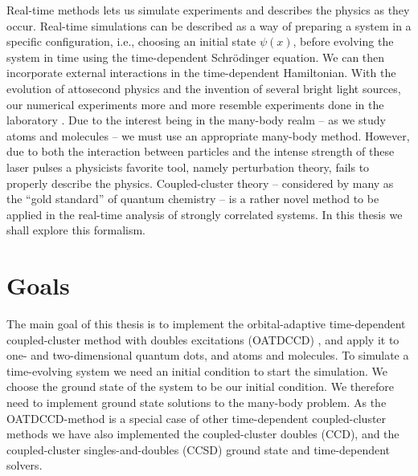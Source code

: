     Real-time methods lets us simulate experiments and describes the physics as
    they occur.
    Real-time simulations can be described as a way of preparing a system in a
    specific configuration, i.e., choosing an initial state $\psi(x)$, before
    evolving the system in time using the time-dependent Schrödinger equation.
    We can then incorporate external interactions in the time-dependent
    Hamiltonian.
    With the evolution of attosecond physics and the invention of several bright
    light sources, our numerical experiments more and more resemble experiments
    done in the laboratory \cite{joachain2012atoms}.
    Due to the interest being in the many-body realm -- as we study atoms and
    molecules -- we must use an appropriate many-body method.
    However, due to both the interaction between particles and the intense
    strength of these laser pulses a physicists favorite tool, namely
    perturbation theory, fails to properly describe the physics.
    Coupled-cluster theory -- considered by many as the ``gold standard'' of
    quantum chemistry -- is a rather novel method to be applied in the real-time
    analysis of strongly correlated systems.
    In this thesis we shall explore this formalism.


    \section{Goals}
        The main goal of this thesis is to implement the orbital-adaptive
        time-dependent coupled-cluster method with doubles excitations (OATDCCD)
        \cite{kvaal2012ab}, and apply it to one- and two-dimensional quantum
        dots, and atoms and molecules.
        To simulate a time-evolving system we need an initial condition to start
        the simulation.
        We choose the ground state of the system to be our initial condition.
        We therefore need to implement ground state solutions to the many-body
        problem.
        As the OATDCCD-method is a special case of other time-dependent
        coupled-cluster methods we have also implemented the coupled-cluster
        doubles (CCD), and the coupled-cluster singles-and-doubles (CCSD) ground
        state and time-dependent solvers.

